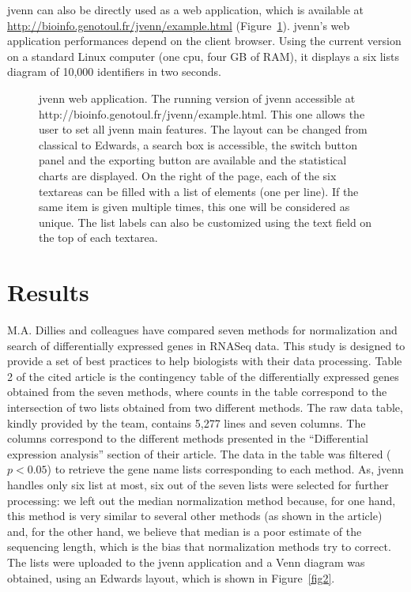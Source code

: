 \documentclass[11pt]{bmc_article_s50}
\begin{document}
jvenn can also be directly used as a web application, which is available at
\url{http://bioinfo.genotoul.fr/jvenn/example.html} (Figure~\ref{fig3}).
jvenn's web application performances depend on the client browser. Using the
current version on a standard Linux computer (one cpu, four GB of RAM), it
displays a six lists diagram of 10,000 identifiers in two seconds.

  \begin{figure}[h!]
  \hrulefill
  \vskip-5pt
\caption{jvenn web application.
      The running version of jvenn accessible at
      {http://bioinfo.genotoul.fr/jvenn/example.html}. This one allows the user to
      set all jvenn main features. The layout can be changed from classical to
      Edwards, a search box is accessible, the switch button panel and the
      exporting button are available and the statistical charts are displayed.
      On the right of the page, each of the six textareas can be filled with a
      list of elements (one per line). If the same item is given multiple times,
      this one will be considered as unique. The list labels can also be customized
      using the text field on the top of each textarea.}\label{fig3}
  \vskip-5pt
\hrulefill
\end{figure}

\section*{Results}

M.A. Dillies and colleagues \cite{Dillies2012} have compared seven methods for
normalization and search of differentially expressed genes in RNASeq data. This
study is designed to provide a set of best practices to help biologists with
their data processing. Table 2 of the cited article is the contingency table
of the differentially expressed genes obtained from the seven methods, where
counts in the table correspond to the intersection of two lists obtained from
two different methods. The raw data table, kindly provided by the team, contains
5,277 lines and seven columns. The columns correspond to the different methods
presented in the ``Differential expression analysis'' section of their article.
The data in the table was filtered ($p < 0.05$) to retrieve the gene name lists
corresponding to each method. As, jvenn handles only six list at most, six out
of the seven lists were selected for further processing: we left out the median
normalization method because, for one hand, this method is very similar to
several other methods (as shown in the article) and, for the other hand, we
believe that median is a poor estimate of the sequencing length, which is the
bias that normalization methods try to correct. The lists were uploaded to the
jvenn application and a Venn diagram was obtained, using an Edwards layout,
which is shown in Figure~\ref{fig2}.
\end{document}
